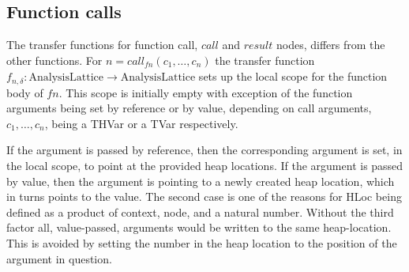 \subsection{Function calls}
The transfer functions for function call, $\mathit{call}$ and $\mathit{result}$ nodes, differs from the other functions. For $n = \mathit{call}_{\mathit{fn}}(c_1,\dots,c_n)$ the transfer function $f_{n,\delta} : \text{AnalysisLattice} \rightarrow \text{AnalysisLattice}$ sets up the local scope for the function body of $\mathit{fn}$. This scope is initially empty with exception of the function arguments being set by reference or by value, depending on call arguments, $c_1, \dots, c_n$, being a { THVar} or a { TVar} respectively. 

If the argument is passed by reference, then the corresponding argument is set, in the local scope, to point at the provided heap locations. If the argument is passed by value, then the argument is pointing to a newly created heap location, which in turns points to the value. The second case is one of the reasons for HLoc being defined as a product of context, node, and a natural number. Without the third factor all, value-passed, arguments would be written to the same heap-location. This is avoided by setting the number in the heap location to the position of the argument in question. 

